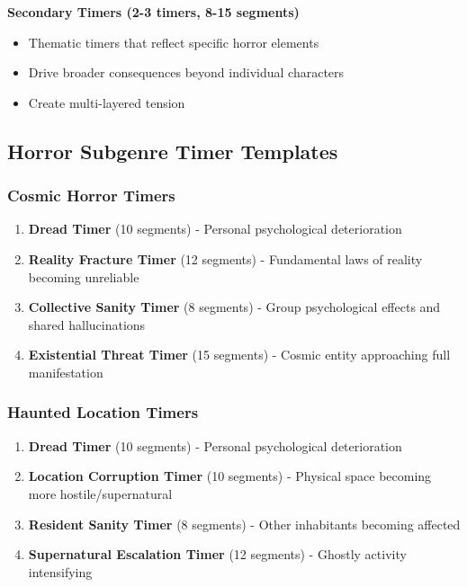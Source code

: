 \documentclass[11pt]{article}
\begin{document}
\textbf{Secondary Timers (2-3 timers, 8-15 segments)}
\begin{itemize}
\item Thematic timers that reflect specific horror elements
\item Drive broader consequences beyond individual characters
\item Create multi-layered tension
\end{itemize}

\subsection{Horror Subgenre Timer Templates}

\subsubsection{Cosmic Horror Timers}
\begin{enumerate}
\item \textbf{Dread Timer } (10 segments) - Personal psychological deterioration
\item \textbf{Reality Fracture Timer } (12 segments) - Fundamental laws of reality becoming unreliable
\item \textbf{Collective Sanity Timer } (8 segments) - Group psychological effects and shared hallucinations
\item \textbf{Existential Threat Timer } (15 segments) - Cosmic entity approaching full manifestation
\end{enumerate}

\subsubsection{Haunted Location Timers}
\begin{enumerate}
\item \textbf{Dread Timer } (10 segments) - Personal psychological deterioration
\item \textbf{Location Corruption Timer } (10 segments) - Physical space becoming more hostile/supernatural
\item \textbf{Resident Sanity Timer } (8 segments) - Other inhabitants becoming affected
\item \textbf{Supernatural Escalation Timer } (12 segments) - Ghostly activity intensifying
\end{enumerate}
\end{document}
